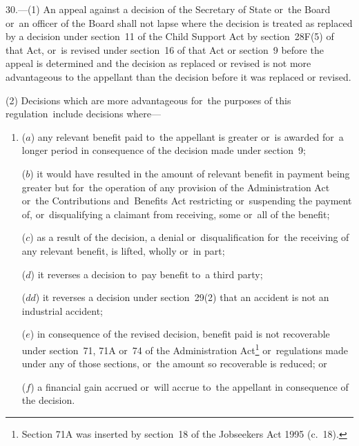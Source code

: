 \documentclass[12pt,a4paper]{article}
\begin{document}
30.—(1) An appeal against a decision of the Secretary of State
or~the Board or~an officer of the Board  %
shall not lapse where the decision 
is treated as replaced by a decision under section~11 of the Child Support Act by section~28F(5) of that Act, or~is revised under section~16 of that Act  %
or section~9 before the appeal is determined and the decision as 
replaced or  %
revised is not more advantageous to the appellant than the decision before it was 
replaced or  %
revised.

(2) Decisions which are more advantageous for~the purposes of this regulation~include decisions where—
\begin{enumerate}\item[]
($a$) any relevant benefit paid to~the appellant is greater or~is awarded for~a longer period in consequence of the decision made under section~9;

($b$) it would have resulted in the amount of relevant benefit in payment being greater but for~the operation of any provision of the Administration Act or~the Contributions and~Benefits Act restricting or~suspending the payment of, or~disqualifying a claimant from receiving, some or~all of the benefit;

($c$) as a result of the decision, a denial or~disqualification for~the receiving of any relevant benefit, is lifted, wholly or~in part;

($d$) it reverses a decision to~pay benefit to~a third party;

($dd$) it reverses a decision under section~29(2) that an accident is not an industrial accident;

($e$) in consequence of the revised decision, benefit paid is not recoverable under section~71, 71A or~74 of the Administration Act\footnote{\frenchspacing Section 71A was inserted by section~18 of the Jobseekers Act 1995 (c.~18).} or~regulations made under any of those sections, or~the amount so recoverable is reduced; or

($f$) a financial gain accrued or~will accrue to~the appellant in consequence of the decision.
\end{enumerate}
\end{document}
